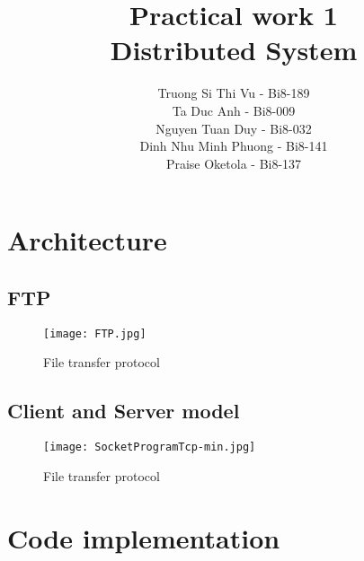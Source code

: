 \documentclass{article}
\begin{document}
\title{Practical work 1\protect\\ Distributed System}
\author{Truong Si Thi Vu - Bi8-189\\ Ta Duc Anh - Bi8-009 \\ Nguyen Tuan Duy - Bi8-032 \\ 
Dinh Nhu Minh Phuong - Bi8-141 \\ Praise Oketola - Bi8-137} 

\maketitle

\tableofcontents
\section{Architecture}
\subsection{FTP}
\begin{figure}
    \centering
    \texttt{[image: FTP.jpg]}
    \caption{File transfer protocol}
\end{figure}

\subsection{Client and Server model}
\begin{figure}
    \centering
    \texttt{[image: SocketProgramTcp-min.jpg]}
    \caption{File transfer protocol}
\end{figure}


\section{Code implementation}
\end{document}
